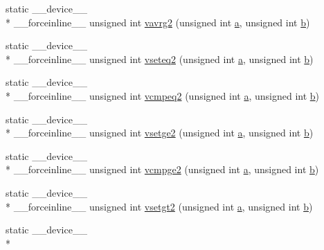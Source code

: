\begin{DoxyCompactItemize}
\item 
static \-\_\-\-\_\-device\-\_\-\-\_\- \\*
\-\_\-\-\_\-forceinline\-\_\-\-\_\- unsigned int \hyperlink{namespacecv_1_1gpu_1_1device_a8e37c1dc6b64948bbd8e5a68174b4f83}{vavrg2} (unsigned int \hyperlink{legacy_8hpp_a1031d0e0a97a340abfe0a6ab9e831045}{a}, unsigned int \hyperlink{legacy_8hpp_ac04272e8ca865b8fba18d36edae9fd2a}{b})
\item 
static \-\_\-\-\_\-device\-\_\-\-\_\- \\*
\-\_\-\-\_\-forceinline\-\_\-\-\_\- unsigned int \hyperlink{namespacecv_1_1gpu_1_1device_aacaf52833243b4cdf06ccea054b0da95}{vseteq2} (unsigned int \hyperlink{legacy_8hpp_a1031d0e0a97a340abfe0a6ab9e831045}{a}, unsigned int \hyperlink{legacy_8hpp_ac04272e8ca865b8fba18d36edae9fd2a}{b})
\item 
static \-\_\-\-\_\-device\-\_\-\-\_\- \\*
\-\_\-\-\_\-forceinline\-\_\-\-\_\- unsigned int \hyperlink{namespacecv_1_1gpu_1_1device_a87fe92374c0d9620e867c8892feb0fd8}{vcmpeq2} (unsigned int \hyperlink{legacy_8hpp_a1031d0e0a97a340abfe0a6ab9e831045}{a}, unsigned int \hyperlink{legacy_8hpp_ac04272e8ca865b8fba18d36edae9fd2a}{b})
\item 
static \-\_\-\-\_\-device\-\_\-\-\_\- \\*
\-\_\-\-\_\-forceinline\-\_\-\-\_\- unsigned int \hyperlink{namespacecv_1_1gpu_1_1device_a2bdd58c95796603defab504cc9bac44e}{vsetge2} (unsigned int \hyperlink{legacy_8hpp_a1031d0e0a97a340abfe0a6ab9e831045}{a}, unsigned int \hyperlink{legacy_8hpp_ac04272e8ca865b8fba18d36edae9fd2a}{b})
\item 
static \-\_\-\-\_\-device\-\_\-\-\_\- \\*
\-\_\-\-\_\-forceinline\-\_\-\-\_\- unsigned int \hyperlink{namespacecv_1_1gpu_1_1device_aa4eb6f3f3aed5130c22bf64b1541d2cd}{vcmpge2} (unsigned int \hyperlink{legacy_8hpp_a1031d0e0a97a340abfe0a6ab9e831045}{a}, unsigned int \hyperlink{legacy_8hpp_ac04272e8ca865b8fba18d36edae9fd2a}{b})
\item 
static \-\_\-\-\_\-device\-\_\-\-\_\- \\*
\-\_\-\-\_\-forceinline\-\_\-\-\_\- unsigned int \hyperlink{namespacecv_1_1gpu_1_1device_a3f2868709c68a9022619880874e6ab23}{vsetgt2} (unsigned int \hyperlink{legacy_8hpp_a1031d0e0a97a340abfe0a6ab9e831045}{a}, unsigned int \hyperlink{legacy_8hpp_ac04272e8ca865b8fba18d36edae9fd2a}{b})
\item 
static \-\_\-\-\_\-device\-\_\-\-\_\- \\*

\end{DoxyCompactItemize}
